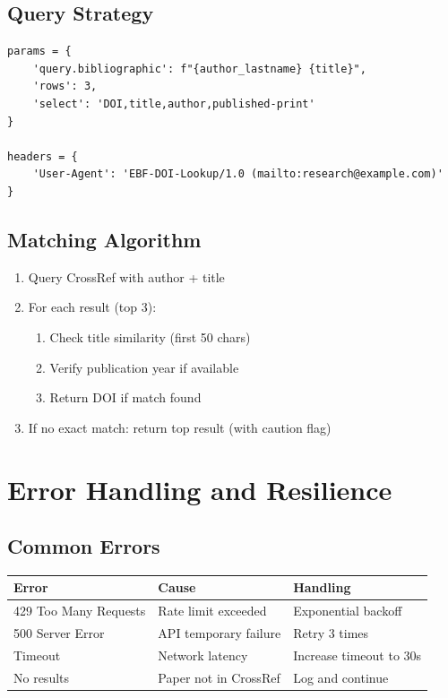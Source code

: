 \subsection{Query Strategy}

\begin{verbatim}
params = {
    'query.bibliographic': f"{author_lastname} {title}",
    'rows': 3,
    'select': 'DOI,title,author,published-print'
}

headers = {
    'User-Agent': 'EBF-DOI-Lookup/1.0 (mailto:research@example.com)'
}
\end{verbatim}

\subsection{Matching Algorithm}

\begin{enumerate}
    \item Query CrossRef with author + title
    \item For each result (top 3):
    \begin{enumerate}
        \item Check title similarity (first 50 chars)
        \item Verify publication year if available
        \item Return DOI if match found
    \end{enumerate}
    \item If no exact match: return top result (with caution flag)
\end{enumerate}

\section{Error Handling and Resilience}
\label{sec:api-errors}

\subsection{Common Errors}

\begin{center}
\begin{tabular}{lll}
\toprule
\textbf{Error} & \textbf{Cause} & \textbf{Handling} \\
\midrule
429 Too Many Requests & Rate limit exceeded & Exponential backoff \\
500 Server Error & API temporary failure & Retry 3 times \\
Timeout & Network latency & Increase timeout to 30s \\
No results & Paper not in CrossRef & Log and continue \\
\bottomrule
\end{tabular}
\end{center}

